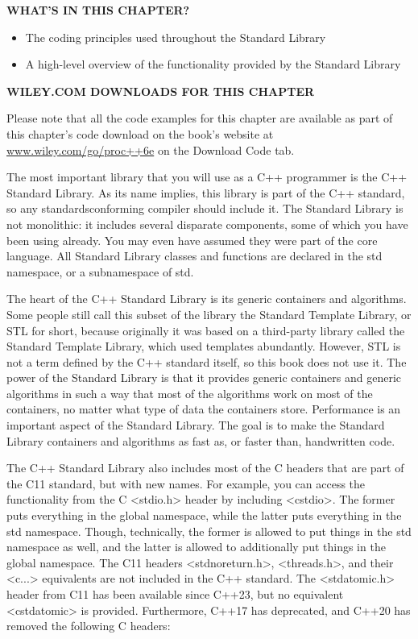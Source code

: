 \noindent
\textbf{WHAT’S IN THIS CHAPTER?}

\begin{itemize}
\item
The coding principles used throughout the Standard Library

\item
A high-level overview of the functionality provided by the Standard Library
\end{itemize}

\noindent
\textbf{WILEY.COM DOWNLOADS FOR THIS CHAPTER}

Please note that all the code examples for this chapter are available as part of this chapter’s code download on the book’s website at \url{www.wiley.com/go/proc++6e} on the Download Code tab.

The most important library that you will use as a C++ programmer is the C++ Standard Library. As its name implies, this library is part of the C++ standard, so any standardsconforming compiler should include it. The Standard Library is not monolithic: it includes several disparate components, some of which you have been using already. You may even have assumed they were part of the core language. All Standard Library classes and functions are declared in the std namespace, or a subnamespace of std.

The heart of the C++ Standard Library is its generic containers and algorithms. Some people still call this subset of the library the Standard Template Library, or STL for short, because originally it was based on a third-party library called the Standard Template Library, which used templates abundantly. However, STL is not a term defined by the C++ standard itself, so this book does not use it. The power of the Standard Library is that it provides generic containers and generic algorithms in such a way that most of the algorithms work on most of the containers, no matter what type of data the containers store. Performance is an important aspect of the Standard Library. The goal is to make the Standard Library containers and algorithms as fast as, or faster than, handwritten code.

The C++ Standard Library also includes most of the C headers that are part of the C11 standard, but with new names. For example, you can access the functionality from the C <stdio.h> header by including <cstdio>. The former puts everything in the global namespace, while the latter puts everything in the std namespace. Though, technically, the former is allowed to put things in the std namespace as well, and the latter is allowed to additionally put things in the global namespace. The C11 headers <stdnoreturn.h>, <threads.h>, and their <c...> equivalents are not included in the C++ standard. The <stdatomic.h> header from C11 has been available since C++23, but no equivalent <cstdatomic> is provided. Furthermore, C++17 has deprecated, and C++20 has removed the following C headers:

